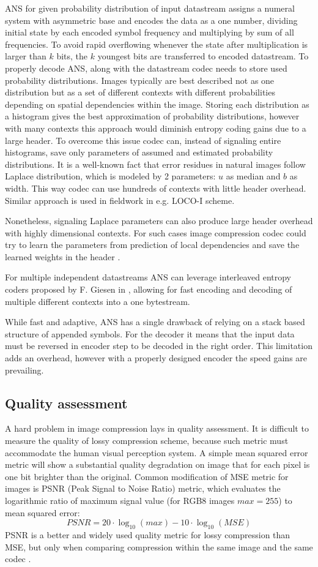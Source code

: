 ANS for given probability distribution of input datastream assigns
a numeral system with asymmetric base and encodes the data as 
a one number, dividing initial state by each encoded symbol frequency and multiplying by sum of all frequencies. 
To avoid rapid overflowing whenever the state after multiplication
is larger than $k$ bits, the $k$ youngest bits are transferred to
encoded datastream. To properly decode ANS, along with the datastream
codec needs to store used probability distributions. Images typically are best described not as one distribution but as
a set of different contexts with different probabilities depending
on spatial dependencies within the image. Storing each distribution
as a histogram gives the best approximation of probability distributions, however
with many contexts this approach would diminish entropy coding gains due to a
large header. To overcome this issue codec can, instead of signaling entire histograms,
save only parameters of assumed and estimated probability distributions. It is a well-known fact
that error residues in natural images follow Laplace distribution, which is
modeled by 2 parameters: $u$ as median and $b$ as width. This way codec can 
use hundreds of contexts with little header overhead. Similar approach is used
in fieldwork in e.g. LOCO-I scheme.

Nonetheless, signaling Laplace parameters can also produce large header overhead with highly dimensional 
contexts. For such cases image compression codec could try to learn the parameters
from prediction of local dependencies and save the learned weights in the header \cite{duda2019laplace}.

For multiple independent datastreams 
ANS can leverage interleaved entropy coders proposed by F. Giesen 
in \cite{giesen2014interleave}, allowing for fast encoding and decoding of multiple
different contexts into a one bytestream.

While fast and adaptive, ANS has a single drawback of relying on a 
stack based structure of appended symbols. For the decoder it means that
the input data must be reversed in encoder step to be decoded in
the right order. This limitation adds an overhead, however with
a properly designed encoder the speed gains are prevailing.


\subsection{Quality assessment}
A hard problem in image compression lays in quality assessment. It is difficult to measure the quality of lossy compression scheme, because
such metric must accommodate the human visual perception system. A simple mean squared error metric will show a substantial quality degradation on image that for each
pixel is one bit brighter than the original. Common modification of MSE metric for images is PSNR (Peak Signal to Noise Ratio) metric, which evaluates 
the logarithmic ratio of maximum signal value (for RGB8 images $max = 255$) to mean squared error:
\[
    PSNR = 20\cdot\log_{10}(max) - 10\cdot\log_{10}(MSE)
\]
PSNR is a better and widely used quality metric for lossy compression than MSE, but only when comparing compression within 
the same image and the same codec \cite{huynh2008psnr}.

